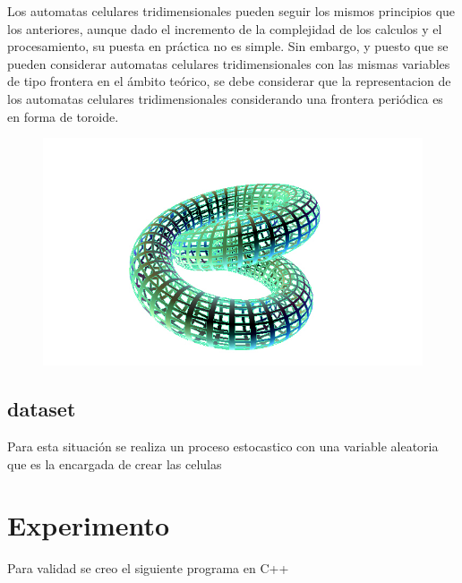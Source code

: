 \documentclass[a4paper,12pt]{article}
\begin{document}
Los automatas celulares tridimensionales pueden seguir los mismos principios que los anteriores, aunque dado el incremento de la complejidad de los calculos y el procesamiento, su puesta en práctica no es simple. Sin embargo, y puesto que se pueden considerar automatas celulares tridimensionales con las mismas variables de tipo frontera en el ámbito teórico, se debe considerar que la representacion de los automatas celulares tridimensionales considerando una frontera periódica es en forma de toroide. 

\begin{figure}[htp]
\centering
\includegraphics[width=8.5      cm]{10.jpg}
\label{fig:lion}
\end{figure}


 \subsection{dataset}
Para esta situación se realiza un proceso estocastico con una variable aleatoria que es la encargada de crear las celulas
  

\section{Experimento}
  Para validad se creo el siguiente programa en C++
\end{document}
